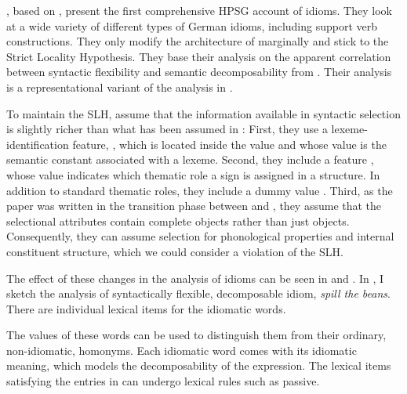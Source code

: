 \documentclass[output=paper]{langsci/langscibook}
\begin{document}
\cite{KE94a}, based on \cite{Erbach92a}, present the first comprehensive HPSG account of idioms. 
They look at a wide variety of different types of German idioms, including support verb constructions. 
They only modify the architecture of \cite{ps2} marginally and stick to the Strict Locality Hypothesis. 
They base their analysis on the apparent correlation between syntactic flexibility and semantic decomposability from \cite{WSN84a-u,NSW94a}. Their analysis is a representational variant of the analysis in \cite{GKPS85a}.

To maintain the SLH, \cite{KE94a} assume that the information available in syntactic selection is slightly richer than what has been assumed in \cite{ps2}:
First, they use a lexeme-identification feature, , which is located inside the  value and whose value is the semantic constant associated with a lexeme. 
Second, they include a feature , whose value indicates which thematic role a sign is assigned in a structure. In addition to standard thematic roles, they include a dummy value .
Third, as the paper was written in the transition phase between \cite{ps} and \cite{ps2}, they assume that the selectional attributes contain complete  objects rather than just  objects. 
Consequently, they can assume selection for phonological properties and internal constituent structure, which we could consider a violation of the SLH. 

The effect of these changes in the analysis of idioms can be seen in  and . In , I sketch the analysis of syntactically flexible, decomposable idiom, \emph{spill the beans}.
There are individual lexical items for the idiomatic words. 


\eal %
\label{ke-spill}
\ex 
{}
\ex 
{}
\zl 

The  values of these words can be used to distinguish them from their ordinary, non-idiomatic, homonyms. 
Each idiomatic word comes with its idiomatic meaning, which models the decomposability of the expression. 
The lexical items satisfying the entries in  can undergo lexical rules such as passive. 
\end{document}
